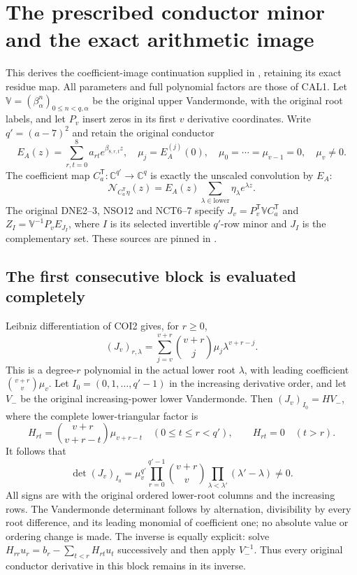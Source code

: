 \section{The prescribed conductor minor and the exact arithmetic image}

This derives the coefficient-image continuation supplied in
\cite{program:arrival03-01}, retaining its exact residue map.
All parameters and full polynomial factors are those of CAL1.
Let $\mathbb V=(\beta_\alpha^n)_{0\le n<q,\alpha}$ be the
original upper Vandermonde, with the original root labels, and let
$P_v$ insert zeros in its first $v$ derivative coordinates.
Write $q'=(a-7)^2$ and retain the original conductor
\[
 E_A(z)=\sum_{r,t=0}^8a_{rt}e^{\beta_{8,r,t}z},\quad
 \mu_j=E_A^{(j)}(0),\quad
 \mu_0=\cdots=\mu_{v-1}=0,\quad\mu_v\ne0.
 \tag{COI1}
\]
The coefficient map $C_a^{\mathsf T}:\mathbb C^{q'}\to\mathbb C^q$
is exactly the unscaled convolution by $E_A$:
\[
 \mathcal N_{C_a^{\mathsf T}\eta}(z)
       =E_A(z)\sum_{\lambda\in\mathrm{lower}}\eta_\lambda e^{\lambda z}.
 \tag{COI2}
\]
The original DNE2--3, NSO12 and NCT6--7 specify
$J_v=P_v^{\mathsf T}\mathbb VC_a^{\mathsf T}$ and
$Z_I=\mathbb V^{-1}P_vE_{J_I}$, where $I$ is its selected invertible
$q'$-row minor and $J_I$ is the complementary set. These sources are
pinned in \cite{program:DNE,program:NCT}.

\subsection{The first consecutive block is evaluated completely}

Leibniz differentiation of COI2 gives, for $r\ge0$,
\[
 (J_v)_{r,\lambda}
       =\sum_{j=v}^{v+r}\binom{v+r}{j}\mu_j\lambda^{v+r-j}.
 \tag{COI3}
\]
This is a degree-$r$ polynomial in the actual lower root $\lambda$,
with leading coefficient $\binom{v+r}{v}\mu_v$.
Let $I_0=(0,1,\ldots,q'-1)$ in the increasing derivative order,
and let $V_-$ be the original increasing-power lower Vandermonde.
Then $(J_v)_{I_0}=HV_-$, where the complete lower-triangular factor is
\[
 H_{rt}=\binom{v+r}{v+r-t}\mu_{v+r-t}\quad(0\le t\le r<q'),
 \qquad H_{rt}=0\quad(t>r).
 \tag{COI4}
\]
It follows that
\[
 \det(J_v)_{I_0}
  =\mu_v^{q'}\prod_{r=0}^{q'-1}\binom{v+r}{v}
       \prod_{\lambda<\lambda'}(\lambda'-\lambda)\ne0.
 \tag{COI5}
\]
All signs are with the original ordered lower-root columns and the
increasing rows. The Vandermonde determinant follows by alternation,
divisibility by every root difference, and its leading monomial of
coefficient one; no absolute value or ordering change is made.
The inverse is equally explicit: solve
$H_{rr}u_r=b_r-\sum_{t<r}H_{rt}u_t$ successively and then
apply $V_-^{-1}$. Thus every original conductor derivative in this
block remains in its inverse.

